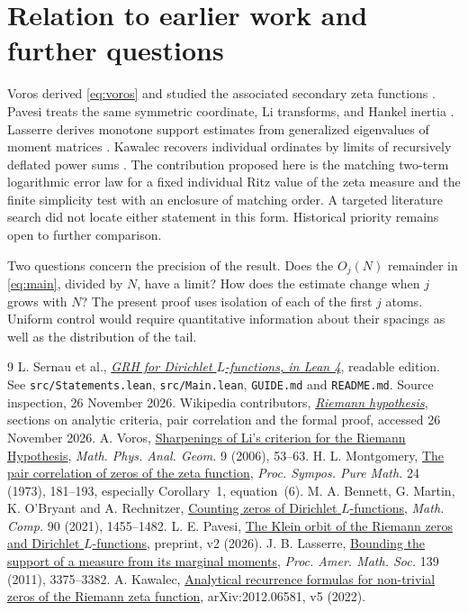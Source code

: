 \documentclass[11pt]{article}
\begin{document}
\section{Relation to earlier work and further questions}
Voros derived \eqref{eq:voros} and studied the associated secondary zeta functions \cite{voros}. Pavesi treats the same symmetric coordinate, Li transforms, and Hankel inertia \cite{pavesi}. Lasserre derives monotone support estimates from generalized eigenvalues of moment matrices \cite{lasserre}. Kawalec recovers individual ordinates by limits of recursively deflated power sums \cite{kawalec}. The contribution proposed here is the matching two-term logarithmic error law for a fixed individual Ritz value of the zeta measure and the finite simplicity test with an enclosure of matching order. A targeted literature search did not locate either statement in this form. Historical priority remains open to further comparison.

Two questions concern the precision of the result. Does the $O_j(N)$ remainder in \eqref{eq:main}, divided by $N$, have a limit? How does the estimate change when $j$ grows with $N$? The present proof uses isolation of each of the first $j$ atoms. Uniform control would require quantitative information about their spacings as well as the distribution of the tail.

\begin{thebibliography}{9}\small
{} L. Sernau et al., \href{https://github.com/lsernau/grh-lean/tree/72fead102f663d5c7a407964a13dc0cf9d977207/grh}{\emph{GRH for Dirichlet $L$-functions, in Lean 4}}, readable edition. See \texttt{src/Statements.lean}, \texttt{src/Main.lean}, \texttt{GUIDE.md} and \texttt{README.md}. Source inspection, 26 November 2026.
 Wikipedia contributors, \href{https://en.wikipedia.org/wiki/Riemann_hypothesis}{\emph{Riemann hypothesis}}, sections on analytic criteria, pair correlation and the formal proof, accessed 26 November 2026.
 A. Voros, \href{https://arxiv.org/abs/math/0506326}{Sharpenings of Li's criterion for the Riemann Hypothesis}, \emph{Math. Phys. Anal. Geom.} 9 (2006), 53--63.
 H. L. Montgomery, \href{https://www-personal.umich.edu/~hlm/paircor1.pdf}{The pair correlation of zeros of the zeta function}, \emph{Proc. Sympos. Pure Math.} 24 (1973), 181--193, especially Corollary~1, equation~(6).
 M. A. Bennett, G. Martin, K. O'Bryant and A. Rechnitzer, \href{https://doi.org/10.1090/mcom/3599}{Counting zeros of Dirichlet $L$-functions}, \emph{Math. Comp.} 90 (2021), 1455--1482.
 L. E. Pavesi, \href{https://doi.org/10.5281/zenodo.22944511}{The Klein orbit of the Riemann zeros and Dirichlet $L$-functions}, preprint, v2 (2026).
 J. B. Lasserre, \href{https://arxiv.org/abs/1011.0138}{Bounding the support of a measure from its marginal moments}, \emph{Proc. Amer. Math. Soc.} 139 (2011), 3375--3382.
 A. Kawalec, \href{https://arxiv.org/abs/2012.06581}{Analytical recurrence formulas for non-trivial zeros of the Riemann zeta function}, arXiv:2012.06581, v5 (2022).
\end{thebibliography}
\end{document}

